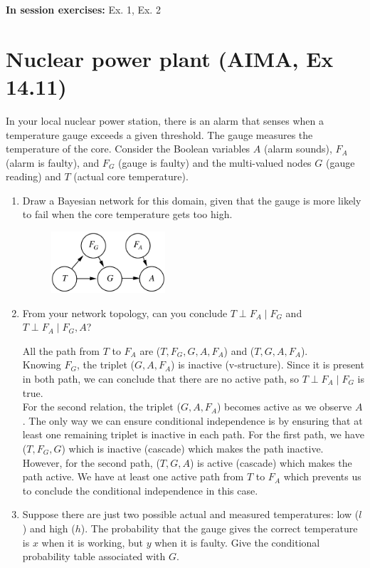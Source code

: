 \documentclass[11pt, a4paper]{article}
\begin{document}
\textbf{In session exercises:} Ex. 1, Ex. 2
\newpage

\section{Nuclear power plant (AIMA, Ex 14.11)}

In your local nuclear power station, there is an alarm that senses when a temperature gauge exceeds a given threshold. The gauge measures the temperature of the core. Consider the Boolean variables $A$ (alarm sounds), $F_A$ (alarm is faulty), and $F_G$ (gauge is faulty) and the multi-valued nodes $G$ (gauge reading) and $T$ (actual core temperature).

\begin{enumerate}
    \item Draw a Bayesian network for this domain, given that the gauge is more likely to fail when the core temperature gets too high.

    \begin{solution}
        \begin{figure}[h]
            \centering
            \includegraphics[width=0.4\textwidth]{figures/e3_nuclear.png}
        \end{figure}
    \end{solution}
    
    \item From your network topology, can you conclude $T \perp F_A \mid F_G$ and $T \perp F_A \mid F_G, A$?
    \begin{solution}

    All the path from $T$ to $F_A$ are ($T,F_G,G,A,F_A$) and ($T,G,A,F_A$).\\

    Knowing $F_G$, the triplet ($G, A, F_A$) is inactive (v-structure). Since it is present in both path, we can conclude that there are no active path, so $T \perp F_A \mid F_G$ is true.\\
    
    For the second relation, the triplet ($G, A, F_A$) becomes active as we observe $A$. The only way we can ensure conditional independence is by ensuring that at least one remaining triplet is inactive in each path.
    For the first path, we have ($T, F_G, G$) which is inactive (cascade) which makes the path inactive. However, for the second path, ($T, G, A$) is active (cascade) which makes the path active. We have at least one active path from $T$ to $F_A$ which prevents us to conclude the conditional independence in this case.
    \end{solution}
    \item Suppose there are just two possible actual and measured temperatures: low ($l$) and high ($h$). The probability that the gauge gives the correct temperature is $x$ when it is working, but $y$ when it is faulty. Give the conditional probability table associated with $G$.


\end{enumerate}
\end{document}
